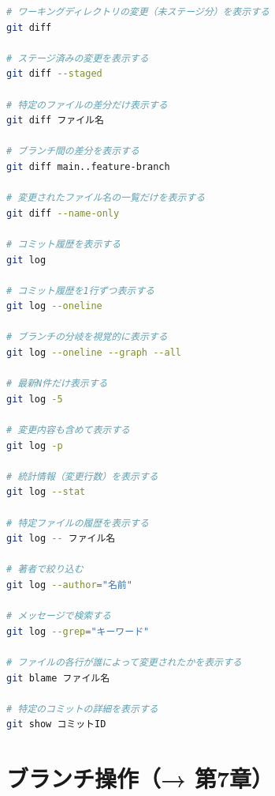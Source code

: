 \begin{lstlisting}[language=bash]
# ワーキングディレクトリの変更（未ステージ分）を表示する
git diff

# ステージ済みの変更を表示する
git diff --staged

# 特定のファイルの差分だけ表示する
git diff ファイル名

# ブランチ間の差分を表示する
git diff main..feature-branch

# 変更されたファイル名の一覧だけを表示する
git diff --name-only

# コミット履歴を表示する
git log

# コミット履歴を1行ずつ表示する
git log --oneline

# ブランチの分岐を視覚的に表示する
git log --oneline --graph --all

# 最新N件だけ表示する
git log -5

# 変更内容も含めて表示する
git log -p

# 統計情報（変更行数）を表示する
git log --stat

# 特定ファイルの履歴を表示する
git log -- ファイル名

# 著者で絞り込む
git log --author="名前"

# メッセージで検索する
git log --grep="キーワード"

# ファイルの各行が誰によって変更されたかを表示する
git blame ファイル名

# 特定のコミットの詳細を表示する
git show コミットID
\end{lstlisting}

\section{ブランチ操作（→ 第7章）}

